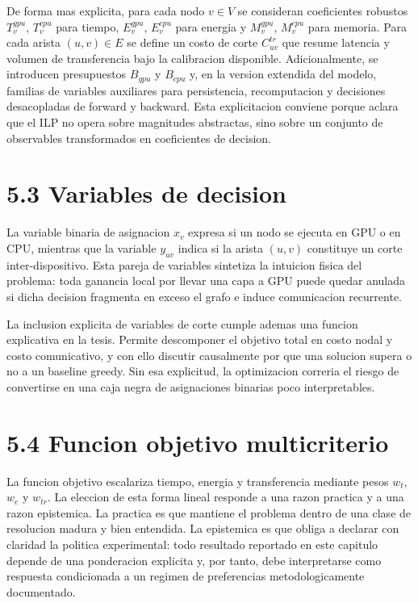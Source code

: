 De forma mas explicita, para cada nodo $v \in V$ se consideran coeficientes robustos $T^{gpu}_v$, $T^{cpu}_v$ para tiempo, $E^{gpu}_v$, $E^{cpu}_v$ para energia y $M^{gpu}_v$, $M^{cpu}_v$ para memoria. Para cada arista $(u,v) \in E$ se define un costo de corte $C^{tr}_{uv}$ que resume latencia y volumen de transferencia bajo la calibracion disponible. Adicionalmente, se introducen presupuestos $B_{gpu}$ y $B_{cpu}$ y, en la version extendida del modelo, familias de variables auxiliares para persistencia, recomputacion y decisiones desacopladas de forward y backward. Esta explicitacion conviene porque aclara que el ILP no opera sobre magnitudes abstractas, sino sobre un conjunto de observables transformados en coeficientes de decision.

\section{5.3 Variables de decision}
La variable binaria de asignacion $x_v$ expresa si un nodo se ejecuta en GPU o en CPU, mientras que la variable $y_{uv}$ indica si la arista $(u,v)$ constituye un corte inter-dispositivo. Esta pareja de variables sintetiza la intuicion fisica del problema: toda ganancia local por llevar una capa a GPU puede quedar anulada si dicha decision fragmenta en exceso el grafo e induce comunicacion recurrente.

La inclusion explicita de variables de corte cumple ademas una funcion explicativa en la tesis. Permite descomponer el objetivo total en costo nodal y costo comunicativo, y con ello discutir causalmente por que una solucion supera o no a un baseline greedy. Sin esa explicitud, la optimizacion correria el riesgo de convertirse en una caja negra de asignaciones binarias poco interpretables.

\section{5.4 Funcion objetivo multicriterio}
La funcion objetivo escalariza tiempo, energia y transferencia mediante pesos $w_t$, $w_e$ y $w_{tr}$. La eleccion de esta forma lineal responde a una razon practica y a una razon epistemica. La practica es que mantiene el problema dentro de una clase de resolucion madura y bien entendida. La epistemica es que obliga a declarar con claridad la politica experimental: todo resultado reportado en este capitulo depende de una ponderacion explicita y, por tanto, debe interpretarse como respuesta condicionada a un regimen de preferencias metodologicamente documentado.

